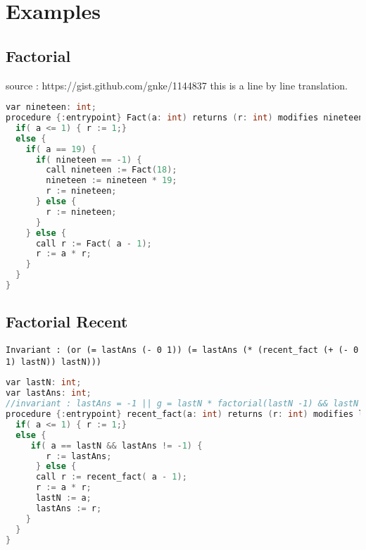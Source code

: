\section{Examples}

\subsection{Factorial}
source : https://gist.github.com/gnke/1144837
this is a line by line translation.

\begin{lstlisting}[language=c, caption= {Procedure `factorial' :
      returns factorial of `n' and memoizes result for argument value
      `19'.}, label=lst:factImpl]
var nineteen: int;
procedure {:entrypoint} Fact(a: int) returns (r: int) modifies nineteen;{
  if( a <= 1) { r := 1;}
  else {
    if( a == 19) {
      if( nineteen == -1) {
        call nineteen := Fact(18);
        nineteen := nineteen * 19;
        r := nineteen;
      } else {
        r := nineteen;
      }
    } else {
      call r := Fact( a - 1);
      r := a * r;
    }
  }
}
\end{lstlisting}

\subsection{Factorial Recent}
\begin{verbatim}
Invariant : (or (= lastAns (- 0 1)) (= lastAns (* (recent_fact (+ (- 0 1) lastN)) lastN)))
\end{verbatim}
\begin{lstlisting}[language=c, caption= {Procedure `recent\_fact' :
      returns factorial of `n' and memoizes result for the last argument value.}, label=lst:factorialRecent]
var lastN: int;
var lastAns: int;
//invariant : lastAns = -1 || g = lastN * factorial(lastN -1) && lastN >1 
procedure {:entrypoint} recent_fact(a: int) returns (r: int) modifies lastN, lastAns;{
  if( a <= 1) { r := 1;}
  else {
     if( a == lastN && lastAns != -1) {
        r := lastAns;
      } else {
      call r := recent_fact( a - 1);    
      r := a * r;
      lastN := a;
      lastAns := r;
    }
  }
}
\end{lstlisting}

